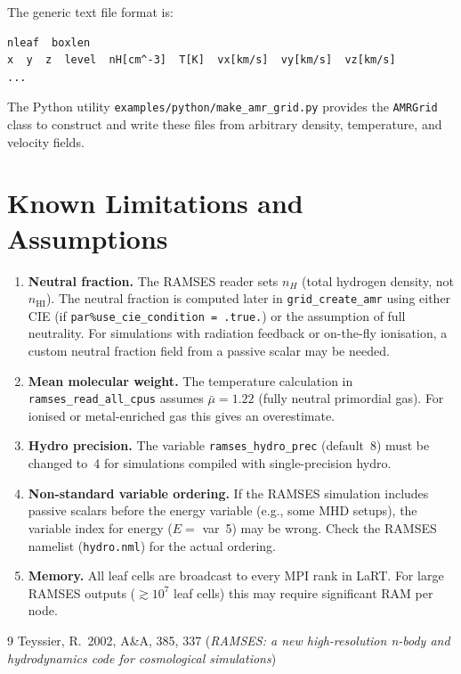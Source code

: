 \documentclass[english,a4paper]{my_memo}
\begin{document}
The generic text file format is:
\begin{lstlisting}[style=shellstyle]
nleaf  boxlen
x  y  z  level  nH[cm^-3]  T[K]  vx[km/s]  vy[km/s]  vz[km/s]
...
\end{lstlisting}

The Python utility \texttt{examples/python/make\_amr\_grid.py} provides the
\texttt{AMRGrid} class to construct and write these files from arbitrary
density, temperature, and velocity fields.

\section{Known Limitations and Assumptions}

\begin{enumerate}
  \item \textbf{Neutral fraction.}  The RAMSES reader sets $n_H$ (total
        hydrogen density, not $n_\mathrm{HI}$).  The neutral fraction is
        computed later in \texttt{grid\_create\_amr} using either CIE
        (if \texttt{par\%use\_cie\_condition = .true.}) or the assumption
        of full neutrality.  For simulations with radiation feedback or
        on-the-fly ionisation, a custom neutral fraction field from a
        passive scalar may be needed.

  \item \textbf{Mean molecular weight.}  The temperature calculation in
        \texttt{ramses\_read\_all\_cpus} assumes $\bar\mu = 1.22$ (fully
        neutral primordial gas).  For ionised or metal-enriched gas this
        gives an overestimate.

  \item \textbf{Hydro precision.}  The variable \texttt{ramses\_hydro\_prec}
        (default~8) must be changed to~4 for simulations compiled with
        single-precision hydro.

  \item \textbf{Non-standard variable ordering.}  If the RAMSES simulation
        includes passive scalars before the energy variable (e.g., some
        MHD setups), the variable index for energy ($E =$ var~5) may be
        wrong.  Check the RAMSES namelist (\texttt{hydro.nml}) for the
        actual ordering.

  \item \textbf{Memory.}  All leaf cells are broadcast to every MPI rank
        in LaRT.  For large RAMSES outputs ($\gtrsim 10^7$ leaf cells)
        this may require significant RAM per node.
\end{enumerate}

\begin{thebibliography}{9}
Teyssier, R.\ 2002, A\&A, 385, 337
(\textit{RAMSES: a new high-resolution n-body and hydrodynamics code for
cosmological simulations})
\end{thebibliography}
\end{document}
